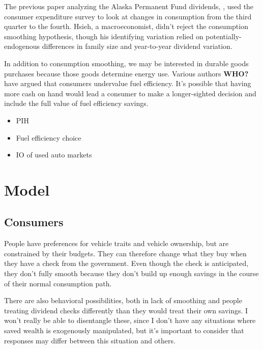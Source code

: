 \documentclass[11pt,letterpaper,oneside]{article}
\begin{document}
\begin{doublespacing}
The previous paper analyzing the Alaska Permanent Fund dividends, \textcite{hsieh2003}, used the consumer expenditure survey to look at changes in consumption from the third quarter to the fourth.
Hsieh, a macroeconomist, didn't reject the consumption smoothing hypothesis, though his identifying variation relied on potentially\hyp{}endogenous differences in family size and year-to-year dividend variation.

In addition to consumption smoothing, we may be interested in durable goods purchases because those goods determine energy use.
Various authors \textbf{WHO?} have argued that consumers undervalue fuel efficiency.
It's possible that having more cash on hand would lead a consumer to make a longer-sighted decision and include the full value of fuel efficiency savings.

\begin{itemize}
    \item PIH
    \item Fuel efficiency choice
    \item IO of used auto markets
\end{itemize}

\section{Model}
\label{sec:model}


\subsection{Consumers}


People have preferences for vehicle traits and vehicle ownership, but are constrained by their budgets.
They can therefore change what they buy when they have a check from the government.
Even though the check is anticipated, they don't fully smooth because they don't build up enough savings in the course of their normal consumption path.

There are also behavioral possibilities, both in lack of smoothing and people treating dividend checks differently than they would treat their own savings.
I won't really be able to disentangle these, since I don't have any situations where saved wealth is exogenously manipulated, but it's important to consider that responses may differ between this situation and others.


\end{doublespacing}
\end{document}
